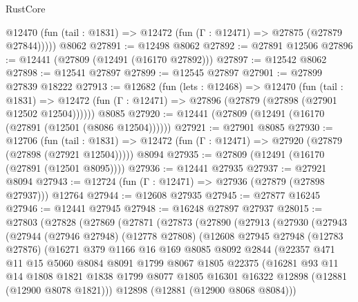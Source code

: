 \begin{lexlean}{RustCore}
\begin{coremodule}
      @12470 (fun (tail : @1831) => @12472 (fun (Γ : @12471) => @27875 (@27879 @27844)))))
    @8062
@27891 := @12498 @8062
@27892 := @27891 @12506
@27896 := @12441 (@27809 (@12491 (@16170 @27892)))
@27897 := @12542 @8062
@27898 := @12541 @27897
@27899 := @12545 @27897
@27901 := @27899 @27839 @18222
@27913 := @12682
    (fun (lets : @12468) =>
    @12470
      (fun (tail : @1831) =>
      @12472 (fun (Γ : @12471) => @27896 (@27879 (@27898 (@27901 @12502 @12504))))))
    @8085
@27920 := @12441 (@27809 (@12491 (@16170 (@27891 (@12501 (@8086 @12504))))))
@27921 := @27901 @8085
@27930 := @12706
    (fun (tail : @1831) => @12472 (fun (Γ : @12471) => @27920 (@27879 (@27898 (@27921 @12504)))))
    @8094
@27935 := @27809 (@12491 (@16170 (@27891 (@12501 @8095))))
@27936 := @12441 @27935
@27937 := @27921 @8094
@27943 := @12724 (fun (Γ : @12471) => @27936 (@27879 (@27898 @27937))) @12764
@27944 := @12608 @27935
@27945 := @27877 @16245
@27946 := @12441 @27945
@27948 := @16248 @27897 @27937
@28015 := @27803
    (@27828
      (@27869
        (@27871
          (@27873
            (@27890
              (@27913
                (@27930
                  (@27943
                    (@27944
                      (@27946 @27948)
                      (@12778 @27808)
                      (@12608
                        @27945
                        @27948
                        (@12783 @27876)
                        (@16271
                          @379
                          @1166
                          @16
                          @169
                          @8085
                          @8092
                          @2844
                          (@22357
                            @471
                            @11
                            @15
                            @5060
                            @8084
                            @8091
                            @1799
                            @8067
                            @1805
                            @22375
                            (@16281
                              @93
                              @11
                              @14
                              @1808
                              @1821
                              @1838
                              @1799
                              @8077
                              @1805
                              @16301
                              @16322
                              @12898
                              (@12881 (@12900 @8078 @1821)))
                            @12898
                            (@12881 (@12900 @8068 @8084)))

\end{coremodule}
\end{lexlean}
